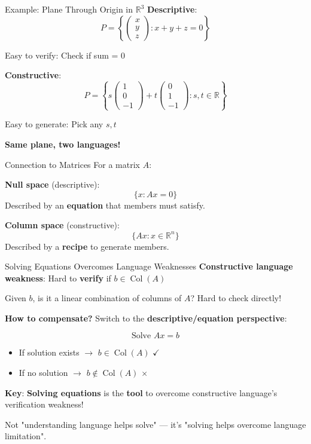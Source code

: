 \documentclass[10pt]{beamer}
\theoremstyle{definition}
\newcommand{\x}[1]{\alert{\textbf{#1}}}
\begin{document}
\begin{frame}{Example: Plane Through Origin in $\mathbb{R}^3$}
\textbf{Descriptive}:
$$P = \left\{ \begin{pmatrix} x \\ y \\ z \end{pmatrix} : x + y + z = 0 \right\}$$

Easy to verify: Check if sum = 0

\vfill
\textbf{Constructive}:
$$P = \left\{ s \begin{pmatrix} 1 \\ 0 \\ -1 \end{pmatrix} + t \begin{pmatrix} 0 \\ 1 \\ -1 \end{pmatrix} : s,t \in \mathbb{R} \right\}$$

Easy to generate: Pick any $s, t$

\vfill
\x{Same plane, two languages!}
\end{frame}

\begin{frame}{Connection to Matrices}
For a matrix $A$:

\vfill
\textbf{Null space} (descriptive):
$$\{ x : Ax = 0 \}$$
Described by an \x{equation} that members must satisfy.

\vfill
\textbf{Column space} (constructive):
$$\{ Ax : x \in \mathbb{R}^n \}$$
Described by a \x{recipe} to generate members.

\end{frame}

\begin{frame}{Solving Equations Overcomes Language Weaknesses}
\x{Constructive language weakness}: Hard to \x{verify} if $b \in \operatorname{Col}(A)$

\vfill
Given $b$, is it a linear combination of columns of $A$? Hard to check directly!

\vfill
\x{How to compensate?} Switch to the \x{descriptive/equation perspective}:

$$\text{Solve } Ax = b$$

\begin{itemize}
\item If solution exists $\to$ $b \in \operatorname{Col}(A)$ $\checkmark$
\item If no solution $\to$ $b \notin \operatorname{Col}(A)$ $\times$
\end{itemize}

\vfill
\x{Key}: \x{Solving equations} is the \x{tool} to overcome constructive language's verification weakness!

Not "understanding language helps solve" — it's "solving helps overcome language limitation".
\end{frame}
\end{document}
